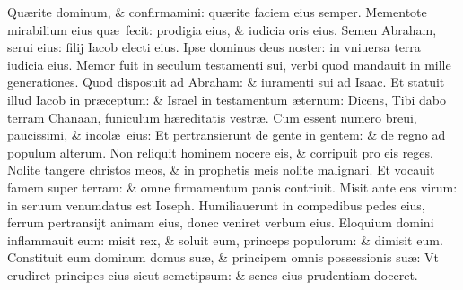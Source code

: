 \documentclass[a5paper,10pt]{book}
\def\ae{æ}
\begin{document}
\begin{multicols*}{2}
\newline \color{red} Q\color{black}u\ae rite dominum, \& confirmamini: qu\ae rite faciem eius semper.
\newline \color{red} M\color{black}ementote mirabilium eius qu\ae \ fecit: prodigia eius, \& iudicia oris eius.
\newline \color{red} S\color{black}emen Abraham, serui eius: filij Iacob electi eius.
\newline \color{red} I\color{black}pse dominus deus noster: in vniuersa terra iudicia eius.
\newline \color{red} M\color{black}emor fuit in seculum testamenti sui, verbi quod mandauit in mille generationes.
\newline \color{red} Q\color{black}uod disposuit ad Abraham: \& iuramenti sui ad Isaac.
\newline \color{red} E\color{black}t statuit illud Iacob in pr\ae ceptum: \& Israel in testamentum \ae ternum:
\newline \color{red} D\color{black}icens, Tibi dabo terram Chanaan, funiculum h\ae reditatis vestr\ae .
\newline \color{red} C\color{black}um essent numero breui, paucissimi, \& incol\ae \ eius:
\newline \color{red} E\color{black}t pertransierunt de gente in gentem: \& de regno ad populum alterum.
\newline \color{red} N\color{black}on reliquit hominem nocere eis, \& corripuit pro eis reges.
\newline \color{red} N\color{black}olite tangere christos meos, \& in prophetis meis nolite malignari.
\newline \color{red} E\color{black}t vocauit famem super terram: \& omne firmamentum panis contriuit.
\newline \color{red} M\color{black}isit ante eos virum: in seruum venumdatus est Ioseph.
\newline \color{red} H\color{black}umiliauerunt in compedibus pedes eius, ferrum pertransijt animam eius, donec veniret verbum eius.
\newline \color{red} E\color{black}loquium domini inflammauit eum: misit rex, \& soluit eum, princeps populorum: \& dimisit eum.
\newline \color{red} C\color{black}onstituit eum dominum domus su\ae , \& principem omnis possessionis su\ae :
\newline \color{red} V\color{black}t erudiret principes eius sicut semetipsum: \& senes eius prudentiam doceret.

\end{multicols*}
\end{document}
